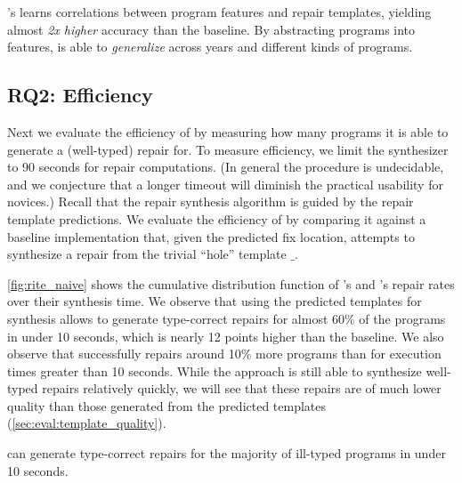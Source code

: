 \begin{framed}
  \noindent \toolname's learns correlations between program features and repair
  templates, yielding almost \emph{2x higher} accuracy than the baseline. By
  abstracting programs into features, \toolname is able to \emph{generalize}
  across years and different kinds of programs.
\end{framed}


\subsection{RQ2: Efficiency}
\label{sec:eval:efficiency}
\label{subsec:eval:man_rep_qual_eval}

Next we evaluate the efficiency of \toolname by measuring how many programs it
is able to generate a (well-typed) repair for.
%
To measure efficiency, we limit the synthesizer to 90 seconds for repair
computations.
(In general the procedure is undecidable, and we
conjecture that a longer timeout will diminish the practical usability for
novices.)
%
Recall that the repair synthesis algorithm is guided by the repair template
predictions.
%
We evaluate the efficiency of \toolname by comparing it against a baseline
\naive implementation that, given the predicted fix location, attempts to
synthesize a repair from the trivial ``hole'' template $\_$.

\autoref{fig:rite_naive} shows the cumulative distribution function of
\toolname's and \naive's repair rates over their synthesis time. We observe that
using the predicted templates for synthesis allows \toolname to generate
type-correct repairs for almost 60\% of the programs in under 10 seconds, which
is nearly 12 points higher than the \naive baseline. We also observe that
\toolname successfully repairs around 10\% more programs than \naive for
execution times greater than 10 seconds. While the \naive approach is still able
to synthesize well-typed repairs relatively quickly, we will see that these
repairs are of much lower quality than those generated from the predicted
templates (\autoref{sec:eval:template_quality}).

\begin{framed}
  \noindent \toolname can generate type-correct repairs for the majority of
  ill-typed programs in under 10 seconds.
\end{framed}


